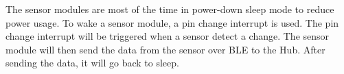 The sensor modules are most of the time in power-down sleep mode to reduce power usage. To wake a sensor module, a pin change interrupt is used. The pin change interrupt will be triggered when a sensor detect a change. The sensor module will then send the data from the sensor over BLE to the Hub. After sending the data, it will go back to sleep.
